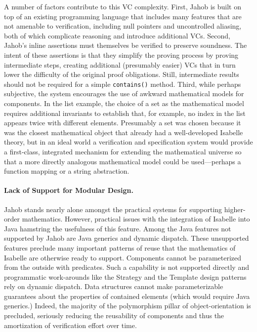 A number of factors contribute to this VC complexity.  First, Jahob is built on top of an existing programming language that includes many features that are not amenable to verification, including null pointers and uncontrolled aliasing, both of which complicate reasoning and introduce additional VCs\cite{weideVerificationReferences}.  Second, Jahob's inline assertions must themselves be verified to preserve soundness.  The intent of these assertions is that they simplify the proving process by proving intermediate steps, creating additional (presumably easier) VCs that in turn lower the difficulty of the original proof obligations.  Still, intermediate results should not be required for a simple \texttt{contains()} method.  Third, while perhaps subjective, the system encourages the use of awkward mathematical models for components.  In the list example, the choice of a set as the mathematical model requires additional invariants to establish that, for example, no index in the list appears twice with different elements.  Presumably a set was chosen because it was the closest mathematical object that already had a well-developed Isabelle theory, but in an ideal world a verification and specification system would provide a first-class, integrated mechanism for extending the mathematical universe so that a more directly analogous mathematical model could be used---perhaps a function mapping or a string abstraction.

\paragraph{Lack of Support for Modular Design.\label{sec:jahobNoModularity}}
Jahob stands nearly alone amongst the practical systems for supporting higher-order mathematics.  However, practical issues with the integration of Isabelle into Java hamstring the usefulness of this feature.  Among the Java features not supported by Jahob are Java generics and dynamic dispatch.  These unsupported features preclude many important patterns of reuse that the mathematics of Isabelle are otherwise ready to support.  Components cannot be parameterized from the outside with predicates.  Such a capability is not supported directly and programmatic work-arounds like the Strategy and the Template design patterns rely on dynamic dispatch.  Data structures cannot make parameterizable guarantees about the properties of contained elements (which would require Java generics.)  Indeed, the majority of the polymorphism pillar of object-orientation is precluded, seriously reducing the reusability of components and thus the amortization of verification effort over time.

